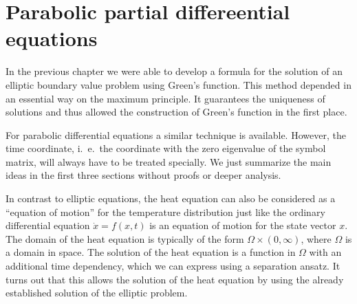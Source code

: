 %
%
%
\chapter{Parabolic partial differeential equations
\label{chapter:parabolic}}
\rhead{}
In the previous chapter we were able to develop a formula for the
solution of an elliptic boundary value problem using Green's 
function.
This method depended in an essential way on the maximum principle.
It guarantees the uniqueness of solutions and thus allowed the
construction of Green's function in the first place.

For parabolic differential equations a similar technique is
available.
However, the time coordinate, i.~e.~the coordinate with 
the zero eigenvalue of the symbol matrix, will always have to be
treated specially.
We just summarize the main ideas in the first three sections
without proofs or deeper analysis.

In contrast to elliptic equations, the heat equation can also be
considered as a ``equation of motion'' for the temperature distribution
just like the ordinary differential equation $\dot x=f(x,t)$ is an
equation of motion for the state vector $x$.
The domain of the heat equation is typically of the form
$\Omega\times(0,\infty)$, where $\Omega$ is a domain in space.
The solution of the heat equation is a function in $\Omega$ with 
an additional time dependency, which we can express using a
separation ansatz.
It turns out that this allows the solution of the heat equation
by using the already established solution of the elliptic problem.








